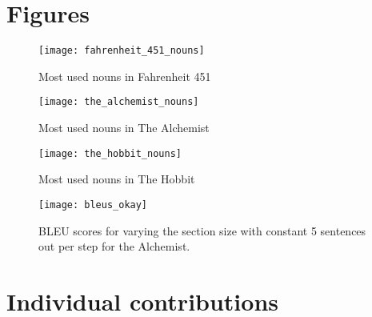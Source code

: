 \begin{appendices}
\section{Figures}
\label{appendix:countfigs}
\begin{figure}[H]
	\centering
	\texttt{[image: fahrenheit\_451\_nouns]}
	\caption{Most used nouns in Fahrenheit 451}\label{fig:fahrenheit_451_nouns}
\end{figure}

\begin{figure}[H]
	\centering
	\texttt{[image: the\_alchemist\_nouns]}
	\caption{Most used nouns in The Alchemist}\label{fig:the_alchemist_nouns}
\end{figure}

\begin{figure}[H]
	\centering
	\texttt{[image: the\_hobbit\_nouns]}
	\caption{Most used nouns in The Hobbit}\label{fig:the_hobbit_nouns}
\end{figure}

\begin{figure}[H]
	\centering
	\texttt{[image: bleus\_okay]}
	\caption{BLEU scores for varying the section size with constant 5 sentences out per step for the Alchemist. }\label{fig:bleus_okay}
\end{figure}


\section{Individual contributions}

\end{appendices}
